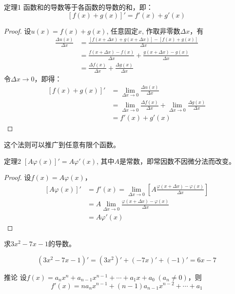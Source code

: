 \begin{blk}
{定理1} 函数和的导数等于各函数的导数的和，即：
\[[f (x) +g (x) ] '=f' (x) +g' (x)\] 
\end{blk}

\begin{proof}
    设$u(x)=f(x)+g(x)$, 任意固定$x$, 作取非零数$\Delta x$，有 
\[\begin{split}
    \frac{\Delta u(x)}{\Delta x}&=\frac{[f(x+\Delta x)+g(x+\Delta x)]-[f(x)+g(x)]}{\Delta x}\\
    &=\frac{f(x+\Delta x)-f(x)}{\Delta x}+\frac{g(x+\Delta x)-g(x)}{\Delta x}\\
    &=\frac{\Delta f(x)}{\Delta x}+\frac{\Delta g(x)}{\Delta x}
\end{split}\]
令$\Delta x\to 0$，即得：
\[\begin{split}
    [f(x)+g(x)]'&=\lim_{\Delta x\to 0}\frac{\Delta u(x)}{\Delta x}\\
    &=\lim_{\Delta x\to 0}\frac{\Delta f(x)}{\Delta x}+\lim_{\Delta x\to 0}\frac{\Delta g(x)}{\Delta x}\\
    &=f'(x)+g'(x)
\end{split}\]
\end{proof}

这个法则可以推广到任意有限个函数。

\begin{blk}
{定理2} $[A\varphi (x)]'=A\varphi'(x)$, 其中$A$是常数，即常因数不因微分法而改变。    
\end{blk}

\begin{proof}
设$f(x)=A\varphi(x)$， 
\[\begin{split}
    [A\varphi(x)]'&=f'(x)=\lim_{\Delta x\to 0}\left[A\frac{\varphi(x+\Delta x)-\varphi(x)}{\Delta x}\right]\\
    &=A\lim_{\Delta x\to 0}\frac{\varphi(x+\Delta x)-\varphi(x)}{\Delta x}\\
    &=A\varphi'(x)
\end{split}\]
\end{proof}



\begin{example}
    求$3x^2-7x-1$的导数。
\end{example}

\begin{solution}
\[  (3x^2-7x-1)'=(3x^2)'+(-7x)'+(-1)'=6x-7\]
\end{solution}    

\begin{blk}{推论}
设$f(x)=a_nx^n+a_{n-1}x^{n-1}+\cdots+a_1x+a_0\; (a_n\ne 0)$，则
\[f'(x)=na_nx^{n-1}+(n-1)a_{n-1}x^{n-2}+\cdots+a_1\]
\end{blk}

